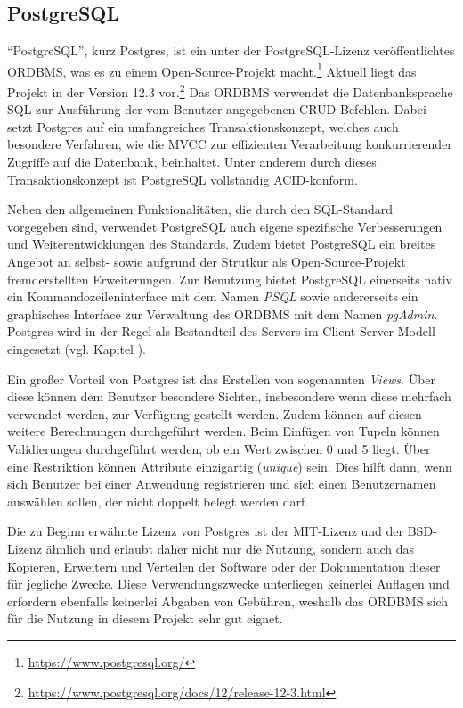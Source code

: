 \subsection{PostgreSQL}
\label{ssec:PostgreSQL}

\enquote{PostgreSQL}, kurz Postgres, ist ein unter der PostgreSQL-Lizenz\autocite{rf-psqllicense} veröffentlichtes \ac{ORDBMS}, was es zu einem Open-Source-Projekt macht.\footnote{\url{https://www.postgresql.org/}}
Aktuell liegt das Projekt in der Version 12.3 vor.\footnote{\url{https://www.postgresql.org/docs/12/release-12-3.html}}
Das \ac{ORDBMS} verwendet die Datenbanksprache \ac{SQL} zur Ausführung der vom Benutzer angegebenen \ac*{CRUD}-Befehlen.
Dabei setzt Postgres auf ein umfangreiches Transaktionskonzept, welches auch besondere Verfahren, wie die \ac*{MVCC} zur effizienten Verarbeitung konkurrierender Zugriffe auf die Datenbank, beinhaltet.
Unter anderem durch dieses Transaktionskonzept ist PostgreSQL vollständig \ac*{ACID}-konform.\autocite[Vgl.][]{rf-psqlfeatures}

Neben den allgemeinen Funktionalitäten, die durch den \ac{SQL}-Standard vorgegeben sind, verwendet PostgreSQL auch eigene spezifische Verbesserungen und Weiterentwicklungen des Standards.
Zudem bietet PostgreSQL ein breites Angebot an selbst- sowie aufgrund der Strutkur als Open-Source-Projekt fremderstellten Erweiterungen.
Zur Benutzung bietet PostgreSQL einerseits nativ ein Kommandozeileninterface mit dem Namen \emph{PSQL} sowie andererseits ein graphisches Interface zur Verwaltung des \ac{ORDBMS} mit dem Namen \emph{pgAdmin}.
Postgres wird in der Regel als Bestandteil des Servers im Client-Server-Modell eingesetzt (vgl. Kapitel ).

Ein großer Vorteil von Postgres ist das Erstellen von sogenannten \emph{Views}.
Über diese können dem Benutzer besondere Sichten, insbesondere wenn diese mehrfach verwendet werden, zur Verfügung gestellt werden.
Zudem können auf diesen weitere Berechnungen durchgeführt werden.
Beim Einfügen von Tupeln können Validierungen durchgeführt werden, \zb ob ein Wert zwischen 0 und 5 liegt.
Über eine Restriktion  können Attribute einzigartig (\emph{unique}) sein.
Dies hilft \ua dann, wenn sich Benutzer bei einer Anwendung registrieren und sich einen Benutzernamen auswählen sollen, der nicht doppelt belegt werden darf.

Die zu Beginn erwähnte Lizenz von Postgres ist der MIT-Lizenz und der BSD-Lizenz ähnlich und erlaubt daher nicht nur die Nutzung, sondern auch das Kopieren, Erweitern und Verteilen der Software oder der Dokumentation dieser für jegliche Zwecke.
Diese Verwendungszwecke unterliegen keinerlei Auflagen und erfordern ebenfalls keinerlei Abgaben von Gebühren, weshalb das \ac{ORDBMS} sich für die Nutzung in diesem Projekt sehr gut eignet.\autocite[Vgl.][]{rf-psqllicense}
